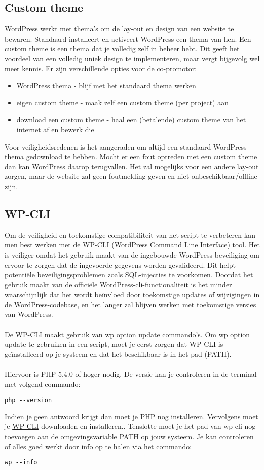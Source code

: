 \subsection{Custom theme}
WordPress werkt met thema's om de lay-out en design van een website te bewaren. Standaard installeert en activeert WordPress een thema van hen. Een custom theme is een thema dat je volledig zelf in beheer hebt. Dit geeft het voordeel van een volledig uniek design te implementeren, maar vergt bijgevolg wel meer kennis. Er zijn verschillende opties voor de co-promotor:
\begin{itemize}
    \item WordPress thema - blijf met het standaard thema werken
    \item eigen custom theme - maak zelf een custom theme (per project) aan
    \item download een custom theme - haal een (betalende) custom theme van het internet af en bewerk die
\end{itemize}
Voor veiligheidsredenen is het aangeraden om altijd een standaard WordPress thema gedownload te hebben. Mocht er een fout optreden met een custom theme dan kan WordPress daarop terugvallen. Het zal mogelijks voor een andere lay-out zorgen, maar de website zal geen foutmelding geven en niet onbeschikbaar/offline zijn. 

\subsection{WP-CLI}
Om de veiligheid en toekomstige compatibiliteit van het script te verbeteren kan men best werken met de WP-CLI (WordPress Command Line Interface) tool. Het is veiliger omdat het gebruik maakt van de ingebouwde WordPress-beveiliging om ervoor te zorgen dat de ingevoerde gegevens worden gevalideerd. Dit helpt potentiële beveiligingsproblemen zoals SQL-injecties te voorkomen. Doordat het gebruik maakt van de officiële WordPress-cli-functionaliteit is het minder waarschijnlijk dat het wordt beïnvloed door toekomstige updates of wijzigingen in de WordPress-codebase, en het langer zal blijven werken met toekomstige versies van WordPress.
\\\\
De WP-CLI maakt gebruik van wp option update commando's. Om wp option update te gebruiken in een script, moet je eerst zorgen dat WP-CLI is geïnstalleerd op je systeem en dat het beschikbaar is in het pad (PATH).
\\\\
Hiervoor is PHP 5.4.0 of hoger nodig. De versie kan je controleren in de terminal met volgend commando:
\begin{verbatim}
php --version
\end{verbatim}
Indien je geen antwoord krijgt dan moet je PHP nog installeren. Vervolgens moet je \href{https://wp-cli.org/#installing}{WP-CLI} downloaden en installeren.. Tenslotte moet je het pad van wp-cli nog toevoegen aan de omgevingsvariable PATH op jouw systeem. Je kan controleren of alles goed werkt door info op te halen via het commando:
\begin{verbatim}
wp --info
\end{verbatim}


